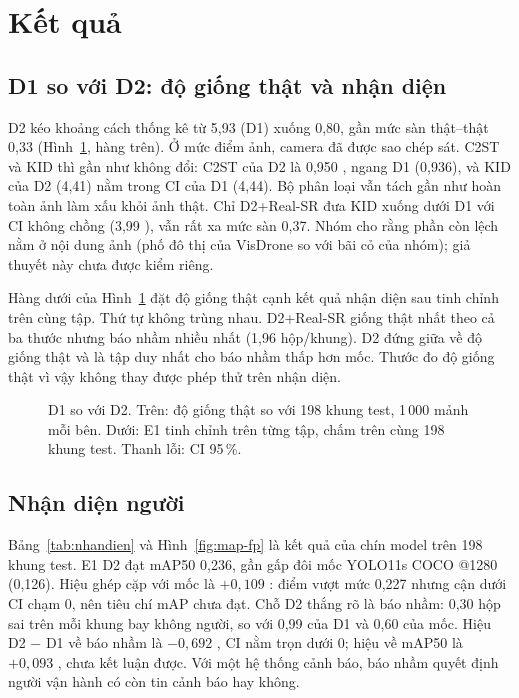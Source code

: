 \section{Kết quả}\label{sec:ket-qua}

\subsection{D1 so với D2: độ giống thật và nhận diện}

D2 kéo khoảng cách thống kê từ 5,93 (D1) xuống 0,80, gần mức sàn thật–thật 0,33 (Hình~\ref{fig:realism}, hàng trên). Ở mức điểm ảnh, camera đã được sao chép sát. C2ST và KID thì gần như không đổi: C2ST của D2 là 0,950 , ngang D1 (0,936), và KID của D2 (4,41) nằm trong CI của D1 (4,44). Bộ phân loại vẫn tách gần như hoàn toàn ảnh làm xấu khỏi ảnh thật. Chỉ D2+Real-SR đưa KID xuống dưới D1 với CI không chồng (3,99 ), vẫn rất xa mức sàn 0,37. Nhóm cho rằng phần còn lệch nằm ở nội dung ảnh (phố đô thị của VisDrone so với bãi cỏ của nhóm); giả thuyết này chưa được kiểm riêng.

Hàng dưới của Hình~\ref{fig:realism} đặt độ giống thật cạnh kết quả nhận diện sau tinh chỉnh trên cùng tập. Thứ tự không trùng nhau. D2+Real-SR giống thật nhất theo cả ba thước nhưng báo nhầm nhiều nhất (1,96 hộp/khung). D2 đứng giữa về độ giống thật và là tập duy nhất cho báo nhầm thấp hơn mốc. Thước đo độ giống thật vì vậy không thay được phép thử trên nhận diện.

\begin{figure}[!htbp]
\centering

\caption[D1 so với D2]{D1 so với D2. Trên: độ giống thật so với 198 khung test, 1\,000 mảnh mỗi bên. Dưới: E1 tinh chỉnh trên từng tập, chấm trên cùng 198 khung test. Thanh lỗi: CI 95\,\%.}
\label{fig:realism}
\end{figure}

\subsection{Nhận diện người}

Bảng~\ref{tab:nhandien} và Hình~\ref{fig:map-fp} là kết quả của chín model trên 198 khung test. E1 D2 đạt mAP50 0,236, gần gấp đôi mốc YOLO11s COCO @1280 (0,126). Hiệu ghép cặp với mốc là $+0{,}109$ : điểm vượt mức 0,227 nhưng cận dưới CI chạm 0, nên tiêu chí mAP chưa đạt. Chỗ D2 thắng rõ là báo nhầm: 0,30 hộp sai trên mỗi khung bay không người, so với 0,99 của D1 và 0,60 của mốc. Hiệu D2 $-$ D1 về báo nhầm là $-0{,}692$ , CI nằm trọn dưới 0; hiệu về mAP50 là $+0{,}093$ , chưa kết luận được. Với một hệ thống cảnh báo, báo nhầm quyết định người vận hành có còn tin cảnh báo hay không.

